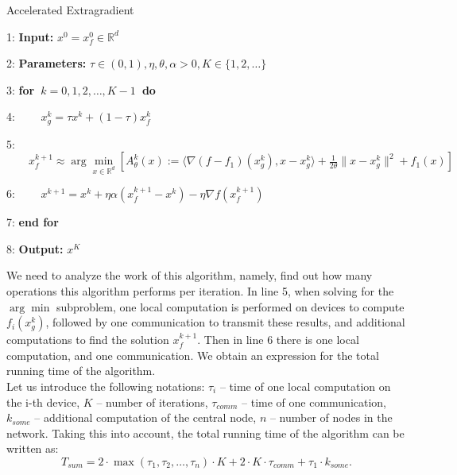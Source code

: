 \documentclass{article}
\theoremstyle{definition}
\theoremstyle{plain}
\begin{document}
\begin{algorithm}
\caption{Accelerated Extragradient}\label{alg:1}
\begin{algorithmic}
\item [1:] \textbf{Input:} $x^0 = x_f^0\in\mathbb R^d$
\item [2:] \textbf{Parameters:} $\tau\in (0, 1), \eta, \theta, \alpha > 0, K\in \{1, 2, \ldots\}$
\item [3:] \textbf{for~}$k = 0, 1, 2, \ldots, K-1$\textbf{~do}
\item [4:]    $\quad\quad x_g^k = \tau x^k + (1 - \tau)x_f^k$
\item [5:]    $\quad\quad x_f^{k+1} \approx \arg\underset{x\in\mathbb R^d}{\min} [A_{\theta}^k (x) := \langle \nabla (f - f_1)(x_g^k), x - x_g^k \rangle + \frac{1}{2\theta}\|x - x_g^k\|^2 + f_1(x)]$ 
\item [6:] $\quad\quad x^{k+1} = x^k + \eta\alpha(x_f^{k+1} - x^k) - \eta\nabla f(x_f^{k+1})$
\item [7:] \textbf{end for}
\item [8:] \textbf{Output:} $x^K$
\end{algorithmic}
\end{algorithm}

We need to analyze the work of this algorithm, namely, find out how many operations this algorithm performs per iteration. In line 5, when solving for the $\arg\min$ subproblem, one local computation is performed on devices to compute $f_i(x_g^k)$, followed by one communication to transmit these results, and additional computations to find the solution $x_f^{k+1}$. Then in line 6 there is one local computation, and one communication. We obtain an expression for the total running time of the algorithm. \\Let us introduce the following notations: $\tau_i$ -- time of one local computation on the i-th device, $K$ -- number of iterations, $\tau_{comm}$ -- time of one communication, $k_{some}$ -- additional computation of the central node, $n$ -- number of nodes in the network. Taking this into account, the total running time of the algorithm can be written as:\\
\begin{equation}
    \label{eq:3}
    T_{sum} = 2\cdot\max(\tau_1, \tau_2, \ldots, \tau_n)\cdot K + 2\cdot K\cdot\tau_{comm} + \tau_1\cdot k_{some}.
\end{equation}
\end{document}

